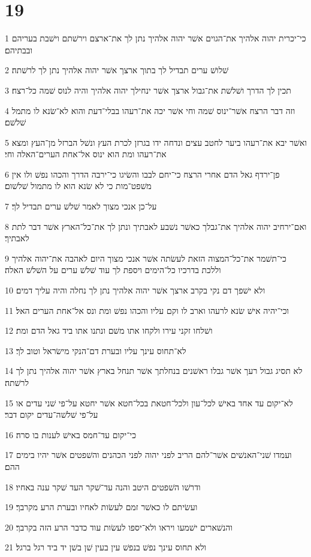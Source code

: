 \chapter{19}

\par 1 כי־יכרית יהוה אלהיך את־הגוים אשׁר יהוה אלהיך נתן לך את־ארצם וירשׁתם וישׁבת בעריהם ובבתיהם׃
\par 2 שׁלושׁ ערים תבדיל לך בתוך ארצך אשׁר יהוה אלהיך נתן לך לרשׁתה׃
\par 3 תכין לך הדרך ושׁלשׁת את־גבול ארצך אשׁר ינחילך יהוה אלהיך והיה לנוס שׁמה כל־רצח׃
\par 4 וזה דבר הרצח אשׁר־ינוס שׁמה וחי אשׁר יכה את־רעהו בבלי־דעת והוא לא־שׂנא לו מתמל שׁלשׁם׃
\par 5 ואשׁר יבא את־רעהו ביער לחטב עצים ונדחה ידו בגרזן לכרת העץ ונשׁל הברזל מן־העץ ומצא את־רעהו ומת הוא ינוס אל־אחת הערים־האלה וחי׃
\par 6 פן־ירדף גאל הדם אחרי הרצח כי־יחם לבבו והשׂיגו כי־ירבה הדרך והכהו נפשׁ ולו אין משׁפט־מות כי לא שׂנא הוא לו מתמול שׁלשׁום׃
\par 7 על־כן אנכי מצוך לאמר שׁלשׁ ערים תבדיל לך׃
\par 8 ואם־ירחיב יהוה אלהיך את־גבלך כאשׁר נשׁבע לאבתיך ונתן לך את־כל־הארץ אשׁר דבר לתת לאבתיך׃
\par 9 כי־תשׁמר את־כל־המצוה הזאת לעשׂתה אשׁר אנכי מצוך היום לאהבה את־יהוה אלהיך וללכת בדרכיו כל־הימים ויספת לך עוד שׁלשׁ ערים על השׁלשׁ האלה׃
\par 10 ולא ישׁפך דם נקי בקרב ארצך אשׁר יהוה אלהיך נתן לך נחלה והיה עליך דמים׃
\par 11 וכי־יהיה אישׁ שׂנא לרעהו וארב לו וקם עליו והכהו נפשׁ ומת ונס אל־אחת הערים האל׃
\par 12 ושׁלחו זקני עירו ולקחו אתו משׁם ונתנו אתו ביד גאל הדם ומת׃
\par 13 לא־תחוס עינך עליו ובערת דם־הנקי מישׂראל וטוב לך׃
\par 14 לא תסיג גבול רעך אשׁר גבלו ראשׁנים בנחלתך אשׁר תנחל בארץ אשׁר יהוה אלהיך נתן לך לרשׁתה׃
\par 15 לא־יקום עד אחד באישׁ לכל־עון ולכל־חטאת בכל־חטא אשׁר יחטא על־פי שׁני עדים או על־פי שׁלשׁה־עדים יקום דבר׃
\par 16 כי־יקום עד־חמס באישׁ לענות בו סרה׃
\par 17 ועמדו שׁני־האנשׁים אשׁר־להם הריב לפני יהוה לפני הכהנים והשׁפטים אשׁר יהיו בימים ההם׃
\par 18 ודרשׁו השׁפטים היטב והנה עד־שׁקר העד שׁקר ענה באחיו׃
\par 19 ועשׂיתם לו כאשׁר זמם לעשׂות לאחיו ובערת הרע מקרבך׃
\par 20 והנשׁארים ישׁמעו ויראו ולא־יספו לעשׂות עוד כדבר הרע הזה בקרבך׃
\par 21 ולא תחוס עינך נפשׁ בנפשׁ עין בעין שׁן בשׁן יד ביד רגל ברגל׃

